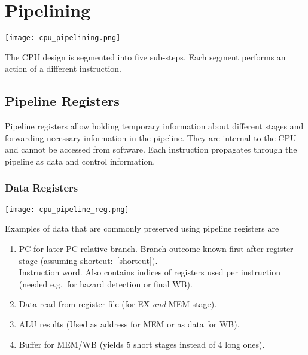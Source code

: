 \section{Pipelining}\label{pipelining}

\texttt{[image: cpu\_pipelining.png]}

The CPU design is segmented into five sub-steps. Each segment performs an action of a different instruction.

\subsection{Pipeline Registers}
Pipeline registers allow holding temporary information about different stages and forwarding necessary information in the pipeline. They are internal to the CPU and cannot be accessed from software. Each instruction propagates through the pipeline as data and control information.
\subsubsection{Data Registers}
\begin{center}
    \texttt{[image: cpu\_pipeline\_reg.png]}
\end{center}
Examples of data that are commonly preserved using pipeline registers are
\begin{enumerate}
    \item PC for later PC-relative branch. Branch outcome known first after register stage (assuming shortcut:~\ref{shortcut}).\\
          Instruction word. Also contains indices of registers used per instruction (needed e.g.\ for hazard detection or final WB).
    \item Data read from register file (for EX \textit{and} MEM stage).
    \item ALU results (Used as address for MEM or as data for WB).
    \item Buffer for MEM/WB (yields 5 short stages instead of 4 long ones).
\end{enumerate}

